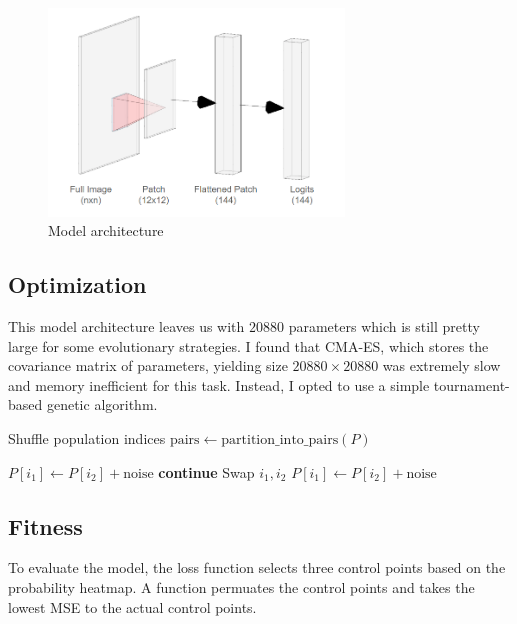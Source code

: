 \documentclass{article}
\begin{document}
\begin{figure}[!ht]
\centering
\includegraphics[width=0.7\textwidth]{model_arch.png}
\caption{Model architecture}
\end{figure}

\subsection{Optimization}

This model architecture leaves us with $20880$ parameters which is still pretty large for some evolutionary strategies. I found that CMA-ES, which stores the covariance matrix of parameters, yielding size $20880\times20880$ was extremely slow and memory inefficient for this task. Instead, I opted to use a simple tournament-based genetic algorithm. 

\begin{algorithmic}
 
    
        \State Shuffle population indices
        \State $\text{pairs} \gets \text{partition\_into\_pairs}(P)$
        
                \State $P[i_1] \gets P[i_2] + \text{noise}$
                \State \textbf{continue}
            \EndIf
                \State Swap $i_1, i_2$
            \EndIf
            \State $P[i_1] \gets P[i_2] + \text{noise}$
        \EndFor
    \EndFor
\EndProcedure
\end{algorithmic}

\subsection{Fitness}
To evaluate the model, the loss function selects three control points based on the probability heatmap. A function permuates the control points and takes the lowest MSE to the actual control points.
\end{document}

